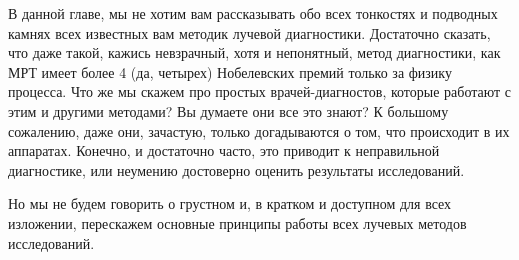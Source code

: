 В данной главе, мы не хотим вам рассказывать обо всех тонкостях и подводных камнях всех известных вам методик лучевой диагностики. Достаточно сказать, что даже такой, кажись невзрачный, хотя и непонятный, метод диагностики, как МРТ имеет более 4 (да, четырех) Нобелевских премий только за физику процесса. Что же мы скажем про простых врачей-диагностов, которые работают с этим и другими методами? Вы думаете они все это знают? К большому сожалению, даже они, зачастую, только догадываются о том,  что происходит в их аппаратах. Конечно, и достаточно часто, это приводит к неправильной диагностике, или неумению достоверно оценить результаты исследований.

Но мы не будем говорить о грустном и, в кратком и доступном для всех изложении, перескажем основные принципы работы всех лучевых методов исследований.